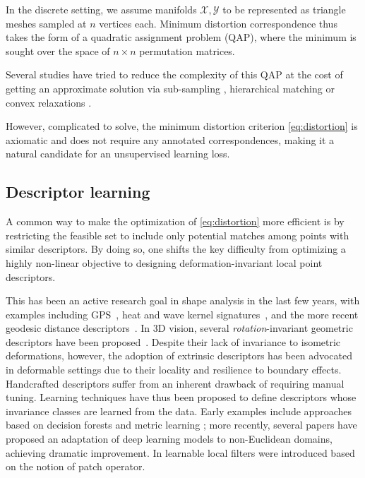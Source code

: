 \documentclass[10pt,twocolumn,letterpaper]{article}
\begin{document}
In the discrete setting, we assume manifolds $\mathcal{X},\mathcal{Y}$ to be represented as triangle meshes sampled at $n$ vertices each. Minimum distortion correspondence thus takes the form of a quadratic assignment problem (QAP), where the minimum is sought over the space of $n \times n$ permutation matrices.

Several studies have tried to reduce the complexity of this QAP at the cost of getting an approximate solution via sub-sampling \cite{tevs2011intrinsic,rodola2012game}, hierarchical matching \cite{bronstein2006generalized,wang2011discrete} or convex relaxations \cite{aflalo2015convex, chen2015robust}. 

However, complicated to solve, the minimum distortion criterion \eqref{eq:distortion} is axiomatic and does not require any annotated correspondences, making it a natural candidate for an unsupervised learning loss.

\subsection{Descriptor learning}

A common way to make the optimization of \eqref{eq:distortion} more efficient is by restricting the feasible set to include only potential matches among points with similar descriptors. By doing so, one shifts the key difficulty from optimizing a highly non-linear objective to designing deformation-invariant local point descriptors. 

This has been an active research goal in shape analysis in the last few years, with examples including GPS~\cite{rustamov2007laplace}, heat and wave kernel signatures~\cite{sun2009concise,aubry2011wave}, and the more recent geodesic distance descriptors~\cite{shamai2017geodesic}. In 3D vision, several {\em rotation}-invariant geometric descriptors have been proposed~\cite{SHOT, johnson1999using}. Despite their lack of invariance to isometric deformations, however, the adoption of extrinsic descriptors has been advocated in deformable settings \cite{rodola2017partial} due to their locality and resilience to boundary effects.
Handcrafted descriptors suffer from an inherent drawback of requiring manual tuning. Learning techniques have thus been proposed to define descriptors whose invariance classes are learned from the data. Early examples include approaches based on decision forests and metric learning \cite{litman2014learning,rodola2014dense,cosmo2016matching}; more recently, several papers have proposed an adaptation of deep learning models to non-Euclidean domains, achieving dramatic improvement. 
In \cite{masci2015geodesic,boscaini2016learning,monet} learnable local filters were introduced based on the notion of patch operator. 
\end{document}
